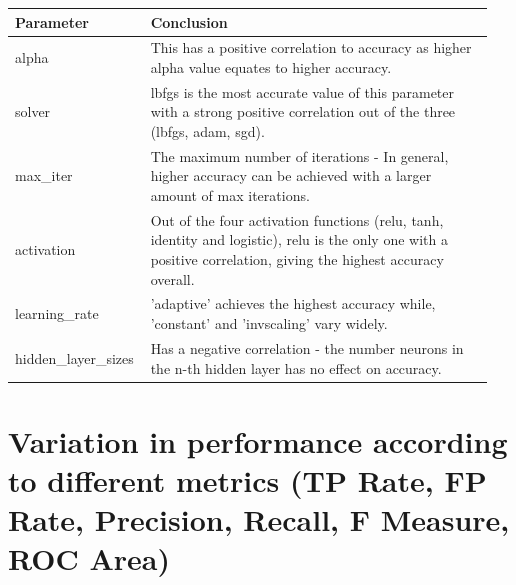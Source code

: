 \documentclass[11pt]{article}
\begin{document}
\begin{table}[ht]
  \centering
  \begin{tabular}{|p{0.25\linewidth} | p{0.7\linewidth}|} 
    \hline
    \textbf{Parameter}  & \textbf{Conclusion} \\ \hline
    alpha & This has a positive correlation to accuracy as higher alpha value equates to higher accuracy. \\ \hline 
    solver & lbfgs is the most accurate value of this parameter with a strong positive correlation out of the three (lbfgs, adam, sgd). \\ \hline
    max\_iter & The maximum number of iterations - In general, higher accuracy can be achieved with a larger amount of max iterations. \\ \hline
    activation & Out of the four activation functions (relu, tanh, identity and logistic), relu is the only one with a positive correlation, giving the highest accuracy overall. \\ \hline  
    learning\_rate & 'adaptive' achieves the highest accuracy while, 'constant' and 'invscaling' vary widely. \\ \hline  
    hidden\_layer\_sizes & Has a negative correlation - the number neurons in the n-th hidden layer has no effect on accuracy. \\ \hline
  \end{tabular}
\end{table}\label{MLP_Analysis_Table}

\newpage
\section{Variation in performance according to different metrics (TP Rate, FP Rate, Precision,
Recall, F Measure, ROC Area)}
\end{document}
